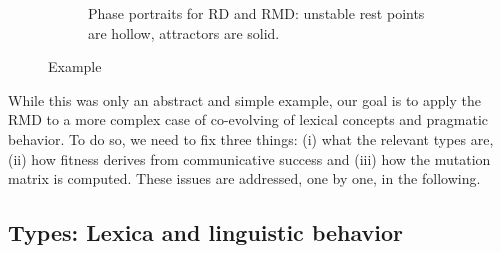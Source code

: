 \documentclass[a4paper, 11pt]{article}
\begin{document}
\begin{figure}[t]
\begin{subfigure}[b]{0.5\textwidth}
    \vspace*{1cm}

        


    \caption{Phase portraits for RD and RMD: unstable rest points are hollow, attractors are
      solid.}
        \label{fig:Phase_RD}
    \end{subfigure}

  \caption{Example}
  \label{fig:Example_RMD}
\end{figure}

While this was only an abstract and simple example, our goal is to apply the RMD to a more
complex case of co-evolving of lexical concepts and pragmatic behavior. To do so, we need to
fix three things: (i) what the relevant types are, (ii) how fitness derives from communicative
success and (iii) how the mutation matrix is computed. These issues are addressed, one by one,
in the following.

\subsection{Types: Lexica and linguistic behavior}
\label{sec:languages+use}
\end{document}
